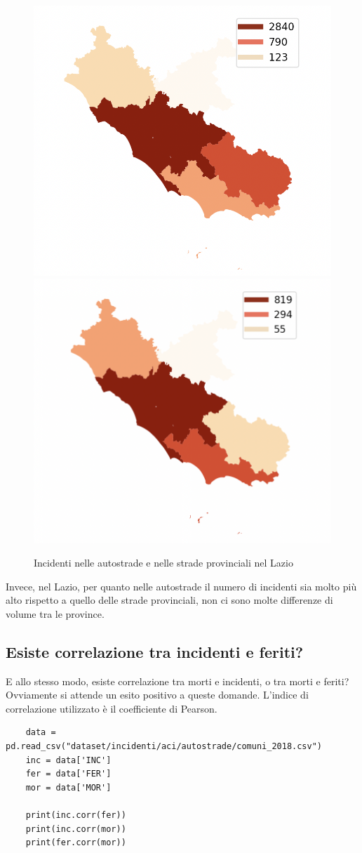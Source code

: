 \documentclass[a4paper]{report}
\begin{document}
\begin{figure}
    \includegraphics[width=0.5\linewidth]{../src/provincia/lazio_autostrade.png}
    \includegraphics[width=0.5\linewidth]{../src/provincia/lazio_strade_prov.png}
    \caption{Incidenti nelle autostrade e nelle strade provinciali nel Lazio}
    \label{fig:lazio-strade}
\end{figure}

Invece, nel Lazio, per quanto nelle autostrade il numero di incidenti sia molto più alto 
rispetto a quello delle strade provinciali, 
non ci sono molte differenze di volume tra le province.

\subsection{Esiste correlazione tra incidenti e feriti?}

E allo stesso modo, esiste correlazione tra morti e incidenti, o tra morti e feriti?\\
Ovviamente si attende un esito positivo a queste domande.
L'indice di correlazione utilizzato è il coefficiente di Pearson.

\begin{lstlisting}
    data = pd.read_csv("dataset/incidenti/aci/autostrade/comuni_2018.csv")
    inc = data['INC']
    fer = data['FER']
    mor = data['MOR']

    print(inc.corr(fer))
    print(inc.corr(mor))
    print(fer.corr(mor))
\end{lstlisting}
\end{document}
